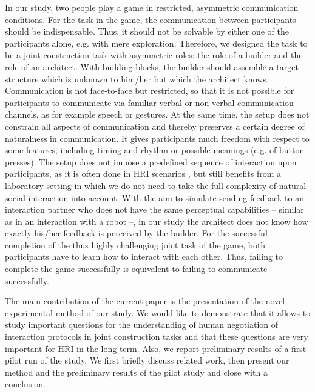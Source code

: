 In our study, two people play a game in restricted, asymmetric communication conditions. For the task in the game, the communication between participants should be indispensable. Thus, it should not be solvable by either one of the participants alone, e.g. with mere exploration. Therefore, we designed the task to be a joint construction task with asymmetric roles: the role of a builder and the role of an architect. With building blocks, the builder should assemble a target structure which is unknown to him/her but which the architect knows. 
Communication is not face-to-face but restricted, so that it is not possible for participants to communicate via familiar verbal or non-verbal communication channels, as for example speech or gestures. At the same time, the setup does not constrain all aspects of communication and thereby preserves a certain degree of naturalness in communication. It gives participants much freedom with respect to some features, including timing and rhythm or possible meanings (e.g. of button presses). The setup does not impose a predefined sequence of interaction upon participants, as it is often done in HRI scenarios \cite{akgun12hri}, but still benefits from a laboratory setting in which we do not need to take the full complexity of natural social interaction into account. With the aim to simulate sending feedback to an interaction partner who does not have the same perceptual capabilities -- similar as in an interaction with a robot --, in our study the architect does not know how exactly his/her feedback is perceived by the builder. For the successful completion of the thus highly challenging joint task of the game, both participants have to learn how to interact with each other. Thus, failing to complete the game successfully is equivalent to failing to communicate successfully.


The main contribution of the current paper is the presentation of the novel experimental method of our study. We would like to demonstrate that it allows to study important questions for the understanding of human negotiation of interaction protocols in joint construction tasks and that these questions are very important for HRI in the long-term. Also, we report preliminary results of a first pilot run of the study. We first briefly discuss related work, then present our method and the preliminary results of the pilot study and close with a conclusion.

